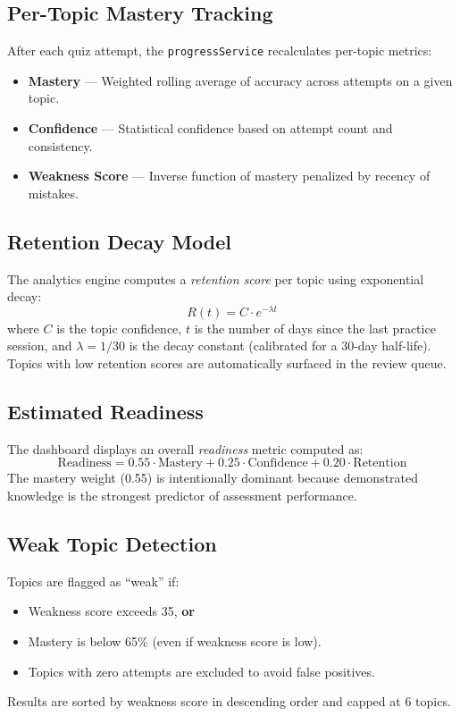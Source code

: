 \documentclass[12pt,a4paper]{article}
\begin{document}
\subsection{Per-Topic Mastery Tracking}
After each quiz attempt, the \texttt{progressService} recalculates per-topic metrics:
\begin{itemize}[leftmargin=1.5cm]
    \item \textbf{Mastery} --- Weighted rolling average of accuracy across attempts on a given topic.
    \item \textbf{Confidence} --- Statistical confidence based on attempt count and consistency.
    \item \textbf{Weakness Score} --- Inverse function of mastery penalized by recency of mistakes.
\end{itemize}

\subsection{Retention Decay Model}
The analytics engine computes a \textit{retention score} per topic using exponential decay:
\[
R(t) = C \cdot e^{-\lambda t}
\]
where $C$ is the topic confidence, $t$ is the number of days since the last practice session, and $\lambda = 1/30$ is the decay constant (calibrated for a 30-day half-life). Topics with low retention scores are automatically surfaced in the review queue.

\subsection{Estimated Readiness}
The dashboard displays an overall \textit{readiness} metric computed as:
\[
\text{Readiness} = 0.55 \cdot \text{Mastery} + 0.25 \cdot \text{Confidence} + 0.20 \cdot \text{Retention}
\]
The mastery weight (0.55) is intentionally dominant because demonstrated knowledge is the strongest predictor of assessment performance.

\subsection{Weak Topic Detection}
Topics are flagged as ``weak'' if:
\begin{itemize}[leftmargin=1.5cm]
    \item Weakness score exceeds 35, \textbf{or}
    \item Mastery is below 65\% (even if weakness score is low).
    \item Topics with zero attempts are excluded to avoid false positives.
\end{itemize}
Results are sorted by weakness score in descending order and capped at 6 topics.
\end{document}

